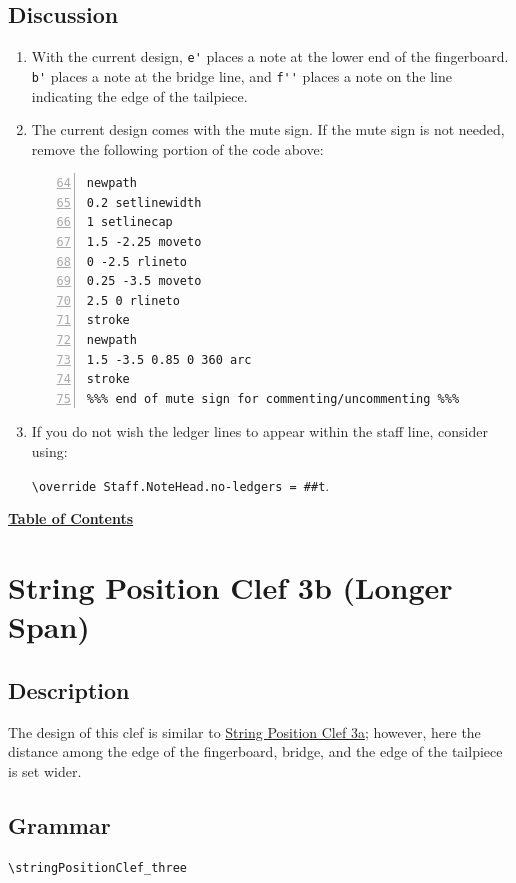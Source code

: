 \subsection{Discussion}
\begin{enumerate}
\item With the current design, \verb|e'| places a note at the lower end of the fingerboard. \verb|b'| places a note at the bridge line, and \verb|f''| places a note on the line indicating the edge of the tailpiece. 

\item The current design comes with the mute sign. If the mute sign is not needed, remove the following portion of the code above:

\begin{Verbatim}[numbers=left,xleftmargin=5mm,firstnumber=64]
%%% mute sign; commentify if not needed %%%
newpath
0.2 setlinewidth
1 setlinecap
1.5 -2.25 moveto
0 -2.5 rlineto
0.25 -3.5 moveto
2.5 0 rlineto
stroke
newpath
1.5 -3.5 0.85 0 360 arc
stroke
%%% end of mute sign for commenting/uncommenting %%%
\end{Verbatim}

\item If you do not wish the ledger lines to appear within the staff line, consider using: \par
 \verb|\override Staff.NoteHead.no-ledgers = ##t|.
\end{enumerate}

\hyperref[sec:toc]{\textbf{Table of Contents}}

\vfill \break


\section {String Position Clef 3b (Longer Span)}
\hfill
{}
\hfill

\subsection{Description}
The design of this clef is similar to \hyperref[sec:StringPositionClef3a]{String Position Clef 3a}; however, here the distance among the edge of the fingerboard, bridge, and the edge of the tailpiece is set wider. 
\subsection{Grammar}
\begin{verbatim}
\stringPositionClef_three 
\end{verbatim}
